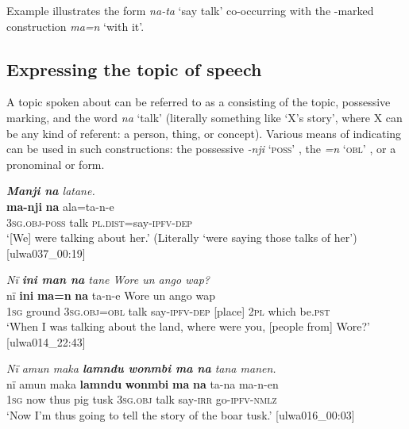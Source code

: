 Example  illustrates the  form \textit{na-ta} ‘say talk’ co-occurring with the -marked  construction \textit{ma=n} ‘with it’.


\subsection{Expressing the topic of speech}\label{sec:13.4.3}


A topic spoken about can be referred to as a  consisting of the topic,  possessive marking, and the word \textit{na} ‘talk’ (literally something like ‘X’s story’, where X can be any kind of referent: a person, thing, or concept). Various means of indicating  can be used in such constructions: the possessive  \textit{{}-nji} ‘\textsc{poss’} \textsc{}, the   \textit{=n} ‘\textsc{obl’} \textsc{}, or a  pronominal  or   form.

\ea%
    \label{ex:syntax:212}
          \textit{\textbf{Manji na} latane.}\\
\gll    \textbf{ma-nji}      \textbf{na}    ala=ta-n-e\\
    3\textsc{sg.obj-poss}  talk  \textsc{pl.dist}=say-\textsc{ipfv-dep}\\
\glt `[We] were talking about her.’ (Literally ‘were saying those talks of her’) [ulwa037\_00:19]
\z

\ea%
    \label{ex:syntax:213}
          \textit{Nï \textbf{ini man na} tane Wore un ango wap?}\\
\gll    nï    \textbf{ini}    \textbf{ma=n}      \textbf{na}    ta-n-e      Wore  un  ango wap\\
    1\textsc{sg}  ground  3\textsc{sg.obj=obl}  talk  say-\textsc{ipfv-dep}  [place]  2\textsc{pl}  which        be.\textsc{pst}\\
\glt `When I was talking about the land, where were you, [people from] Wore?’ [ulwa014\_22:43]
\z

\ea%
    \label{ex:syntax:214}
          \textit{Nï amun maka \textbf{lamndu wonmbi ma na} tana manen.}\\
\gll    nï    amun  maka  \textbf{lamndu}   \textbf{wonmbi}  \textbf{ma}      \textbf{na}     ta-na    ma-n-en\\
    1\textsc{sg}  now  thus  pig      tusk    3\textsc{sg.obj}  talk    say-\textsc{irr}  go-\textsc{ipfv-nmlz}\\
\glt `Now I’m thus going to tell the story of the boar tusk.’ [ulwa016\_00:03]
\z

